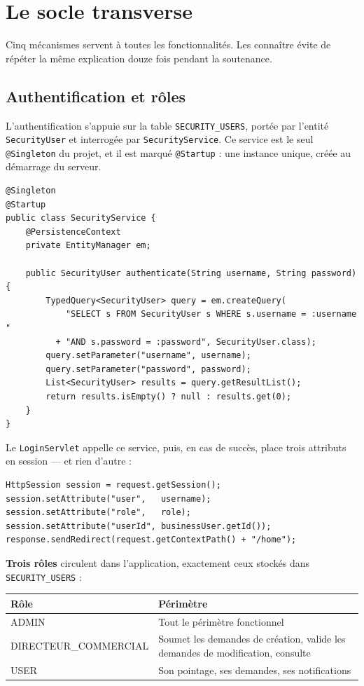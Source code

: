 \section{Le socle transverse}

Cinq mécanismes servent à toutes les fonctionnalités. Les connaître évite de
répéter la même explication douze fois pendant la soutenance.

\subsection{Authentification et rôles}

L'authentification s'appuie sur la table \texttt{SECURITY\_USERS}, portée par
l'entité \texttt{SecurityUser} et interrogée par \texttt{SecurityService}. Ce
service est le seul \texttt{@Singleton} du projet, et il est marqué
\texttt{@Startup} : une instance unique, créée au démarrage du serveur.

\begin{lstlisting}[style=java]
@Singleton
@Startup
public class SecurityService {
    @PersistenceContext
    private EntityManager em;

    public SecurityUser authenticate(String username, String password) {
        TypedQuery<SecurityUser> query = em.createQuery(
            "SELECT s FROM SecurityUser s WHERE s.username = :username "
          + "AND s.password = :password", SecurityUser.class);
        query.setParameter("username", username);
        query.setParameter("password", password);
        List<SecurityUser> results = query.getResultList();
        return results.isEmpty() ? null : results.get(0);
    }
}
\end{lstlisting}

Le \texttt{LoginServlet} appelle ce service, puis, en cas de succès, place
trois attributs en session --- et rien d'autre :

\begin{lstlisting}[style=java]
HttpSession session = request.getSession();
session.setAttribute("user",   username);
session.setAttribute("role",   role);
session.setAttribute("userId", businessUser.getId());
response.sendRedirect(request.getContextPath() + "/home");
\end{lstlisting}

\textbf{Trois rôles} circulent dans l'application, exactement ceux stockés dans
\texttt{SECURITY\_USERS} :

\noindent\begin{tabularx}{\textwidth}{|>{\ttfamily}L{4.2cm}|X|}
\hline
\textmd{\textbf{Rôle}} & \textbf{Périmètre}\\
\hline
ADMIN & Tout le périmètre fonctionnel\\
\hline
DIRECTEUR\_COMMERCIAL & Soumet les demandes de création, valide les demandes de modification, consulte\\
\hline
USER & Son pointage, ses demandes, ses notifications\\
\hline
\end{tabularx}

